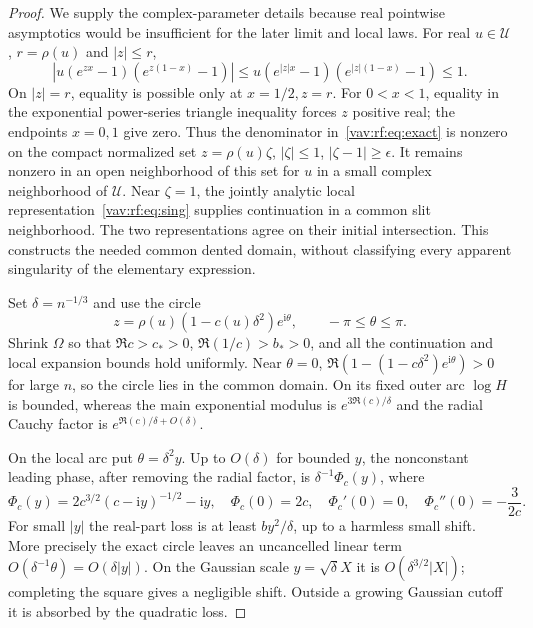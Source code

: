 \documentclass[11pt]{article}
\theoremstyle{remark}\newtheorem{remark}[theorem]{Remark}
\newcommand{\ii}{\mathrm i}
\begin{document}
\begin{proof}
We supply the complex-parameter details because real pointwise asymptotics would be insufficient for the later limit and local laws. For real $u\in \mathcal U$, $r=\rho(u)$ and $|z|\le r$,
\begin{equation}\label{vav:rf:eq:denom}
 |u(e^{zx}-1)(e^{z(1-x)}-1)|
 \le u(e^{|z|x}-1)(e^{|z|(1-x)}-1)\le1.
\end{equation}
On $|z|=r$, equality is possible only at $x=1/2,z=r$. For $0<x<1$, equality in the exponential power-series triangle inequality forces $z$ positive real; the endpoints $x=0,1$ give zero. Thus the denominator in~\eqref{vav:rf:eq:exact} is nonzero on the compact normalized set $z=\rho(u)\zeta$, $|\zeta|\le1$, $|\zeta-1|\ge\epsilon$. It remains nonzero in an open neighborhood of this set for $u$ in a small complex neighborhood of $\mathcal U$. Near $\zeta=1$, the jointly analytic local representation~\eqref{vav:rf:eq:sing} supplies continuation in a common slit neighborhood. The two representations agree on their initial intersection. This constructs the needed common dented domain, without classifying every apparent singularity of the elementary expression.

Set $\delta=n^{-1/3}$ and use the circle
\begin{equation}\label{vav:rf:eq:circle}
 z=\rho(u)(1-c(u)\delta^2)e^{\ii\theta},\qquad -\pi\le\theta\le\pi.
\end{equation}
Shrink $\Omega$ so that $\Re c>c_*>0$, $\Re(1/c)>b_*>0$, and all the continuation and local expansion bounds hold uniformly. Near $\theta=0$, $\Re(1-(1-c\delta^2)e^{\ii\theta})>0$ for large $n$, so the circle lies in the common domain. On its fixed outer arc $\log H$ is bounded, whereas the main exponential modulus is $e^{3\Re(c)/\delta}$ and the radial Cauchy factor is $e^{\Re(c)/\delta+O(\delta)}$.

On the local arc put $\theta=\delta^2y$. Up to $O(\delta)$ for bounded $y$, the nonconstant leading phase, after removing the radial factor, is $\delta^{-1}\Phi_c(y)$, where
\[
 \Phi_c(y)=2c^{3/2}(c-\ii y)^{-1/2}-\ii y,\quad
 \Phi_c(0)=2c,\quad \Phi_c'(0)=0,\quad \Phi_c''(0)=-\frac{3}{2c}.
\]
For small $|y|$ the real-part loss is at least $b y^2/\delta$, up to a harmless small shift. More precisely the exact circle leaves an uncancelled linear term $O(\delta^{-1}\theta)=O(\delta |y|)$. On the Gaussian scale $y=\sqrt\delta X$ it is $O(\delta^{3/2}|X|)$; completing the square gives a negligible shift. Outside a growing Gaussian cutoff it is absorbed by the quadratic loss.


\end{proof}
\end{document}
